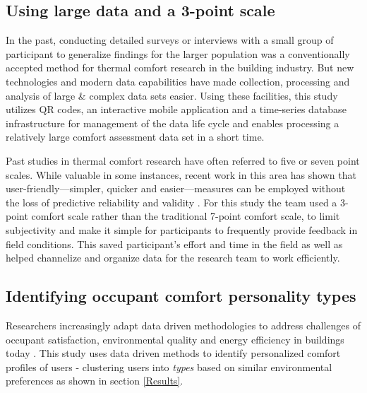 \documentclass[]{interact}
\theoremstyle{plain}%
\theoremstyle{definition}
\theoremstyle{remark}
\begin{document}
\subsection{Using large data and a 3-point scale}

In the past, conducting detailed surveys or interviews with a small group of participant to generalize findings for the larger population was a conventionally accepted method for thermal comfort research in the building industry. But new technologies and modern data capabilities have made collection, processing and analysis of large \& complex data sets easier. Using these facilities, this study utilizes QR codes, an interactive mobile application and a time-series database infrastructure for management of the data life cycle and enables processing a relatively large comfort assessment data set in a short time. 

Past studies in thermal comfort research have often referred to five or seven point scales. While valuable in some instances, recent work in this area has shown that user-friendly---simpler, quicker and easier---measures can be employed without the loss of predictive reliability and validity \cite{dolnicar2007user, krosnick2018questionnaire, dolnicar2011three}. For this study the team used a 3-point comfort scale rather than the traditional 7-point comfort scale, to limit subjectivity and make it simple for participants to frequently provide feedback in field conditions. This saved participant's effort and time in the field as well as helped channelize and organize data for the research team to work efficiently. 



\subsection{Identifying occupant comfort personality types}
Researchers increasingly adapt data driven methodologies to address challenges of occupant satisfaction, environmental quality and energy efficiency in buildings today \cite{Textmining, occupantcomplaints, IEQandsatisfaction}. This study uses data driven methods to identify personalized comfort profiles of users - clustering users into \emph{types} based on similar environmental preferences as shown in section \ref{Results}. 
\end{document}
